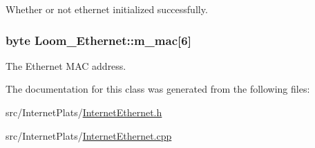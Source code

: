 Whether or not ethernet initialized successfully. 

\subsubsection[{\texorpdfstring{m\+\_\+mac}{m_mac}}]{\setlength{\rightskip}{0pt plus 5cm}byte Loom\+\_\+\+Ethernet\+::m\+\_\+mac\mbox{[}6\mbox{]}\hspace{0.3cm}{\ttfamily [protected]}}\hypertarget{class_loom___ethernet_ad3ac39aaf45c0c53965d029e9c1db7a4}{}\label{class_loom___ethernet_ad3ac39aaf45c0c53965d029e9c1db7a4}


The Ethernet M\+AC address. 



The documentation for this class was generated from the following files\+:\begin{DoxyCompactItemize}
\item 
src/\+Internet\+Plats/\hyperlink{_internet_ethernet_8h}{Internet\+Ethernet.\+h}\item 
src/\+Internet\+Plats/\hyperlink{_internet_ethernet_8cpp}{Internet\+Ethernet.\+cpp}\end{DoxyCompactItemize}
